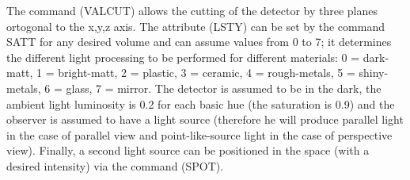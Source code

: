 The command (VALCUT) allows the cutting of the detector by three planes
ortogonal to the x,y,z axis. The attribute (LSTY) can be set by the command
SATT for any desired volume and can assume values from 0 to 7; it determines
the different light processing to be performed for different materials:
0 = dark-matt, 1 = bright-matt, 2 = plastic, 3 = ceramic, 4 = rough-metals,
5 = shiny-metals, 6 = glass, 7 = mirror. The detector is assumed to be in the
dark, the ambient light luminosity is 0.2 for each basic hue (the saturation
is 0.9) and the observer is assumed to have a light source (therefore he will
produce parallel light in the case of parallel view and point-like-source
light in the case of perspective view). Finally, a second light source can 
be positioned in the space (with a desired intensity) via the command (SPOT).








   


   









